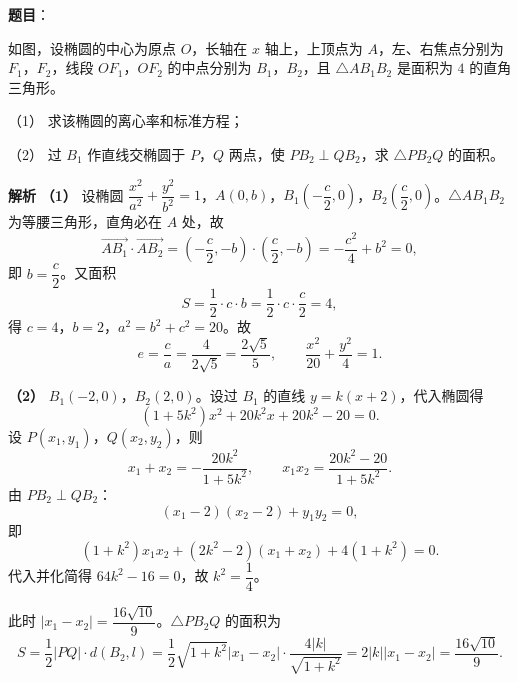 \begin{answer}

\textbf{题目}：

如图，设椭圆的中心为原点 $O$，长轴在 $x$ 轴上，上顶点为 $A$，左、右焦点分别为 $F_1$，$F_2$，线段 $OF_1$，$OF_2$ 的中点分别为 $B_1$，$B_2$，且 $\triangle AB_1B_2$ 是面积为 $4$ 的直角三角形。

（1） 求该椭圆的离心率和标准方程；

（2） 过 $B_1$ 作直线交椭圆于 $P$，$Q$ 两点，使 $PB_2\perp QB_2$，求 $\triangle PB_2Q$ 的面积。
\nopagebreak[4]
\begin{center}\end{center}
\nopagebreak[4]
\textbf{解析}
\textbf{（1）} 设椭圆 $\dfrac{x^2}{a^2}+\dfrac{y^2}{b^2}=1$，$A(0,b)$，$B_1\left(-\dfrac c2,0\right)$，$B_2\left(\dfrac c2,0\right)$。$\triangle AB_1B_2$ 为等腰三角形，直角必在 $A$ 处，故
\nopagebreak[4]
\[\overrightarrow{AB_1}\cdot\overrightarrow{AB_2}=\left(-\frac c2,-b\right)\cdot\left(\frac c2,-b\right)=-\frac{c^2}4+b^2=0,\]
即 $b=\dfrac c2$。又面积
\nopagebreak[4]
\[S=\frac12\cdot c\cdot b=\frac12\cdot c\cdot\frac c2=4,\]
得 $c=4$，$b=2$，$a^2=b^2+c^2=20$。故
\nopagebreak[4]
\[e=\frac ca=\frac4{2\sqrt5}=\frac{2\sqrt5}5,\qquad \frac{x^2}{20}+\frac{y^2}4=1.\]

\textbf{（2）} $B_1(-2,0)$，$B_2(2,0)$。设过 $B_1$ 的直线 $y=k(x+2)$，代入椭圆得
\nopagebreak[4]
\[(1+5k^2)x^2+20k^2x+20k^2-20=0.\]
设 $P(x_1,y_1)$，$Q(x_2,y_2)$，则
\nopagebreak[4]
\[x_1+x_2=-\frac{20k^2}{1+5k^2},\qquad x_1x_2=\frac{20k^2-20}{1+5k^2}.\]
由 $PB_2\perp QB_2$：
\nopagebreak[4]
\[(x_1-2)(x_2-2)+y_1y_2=0,\]
即
\nopagebreak[4]
\[(1+k^2)x_1x_2+(2k^2-2)(x_1+x_2)+4(1+k^2)=0.\]
代入并化简得 $64k^2-16=0$，故 $k^2=\dfrac14$。

此时 $|x_1-x_2|=\dfrac{16\sqrt{10}}9$。$\triangle PB_2Q$ 的面积为
\nopagebreak[4]
\[S=\frac12|PQ|\cdot d(B_2,l)=\frac12\sqrt{1+k^2}|x_1-x_2|\cdot\frac{4|k|}{\sqrt{1+k^2}}=2|k||x_1-x_2|=\frac{16\sqrt{10}}9.\]



\end{answer}